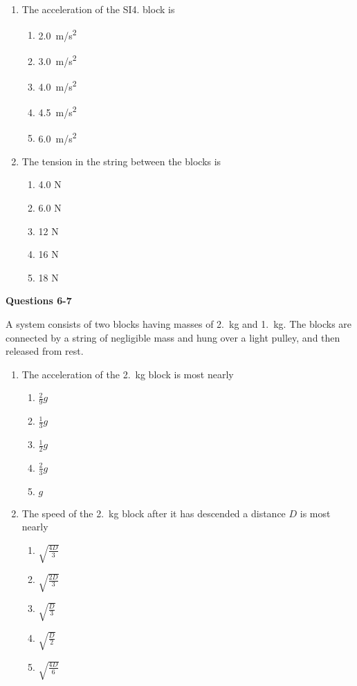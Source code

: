 \documentclass{../../oss-apphys}
\begin{document}
\begin{multicols}{2}
\begin{enumerate}[resume,leftmargin=18pt]
  \item The acceleration of the SI{4.}{\kilo\gram} block is
    \begin{enumerate}[noitemsep,topsep=0pt,leftmargin=18pt,label=(\Alph*)]
    \item\SI{2.0}{m/s^2}
    \item\SI{3.0}{m/s^2}
    \item\SI{4.0}{m/s^2}
    \item\SI{4.5}{m/s^2}
    \item\SI{6.0}{m/s^2}
    \end{enumerate}

  \item The tension in the string between the blocks is
    \begin{enumerate}[noitemsep,topsep=0pt,leftmargin=18pt,label=(\Alph*)]
    \item 4.0 N
    \item 6.0 N
    \item 12 N
    \item 16 N
    \item 18 N
    \end{enumerate}
  \end{enumerate}
  \columnbreak
  
  \textbf{Questions 6-7}

  A system consists of two blocks having masses of \SI{2.}{\kilo\gram} and
  \SI{1.}{\kilo\gram}. The blocks are connected by a string of negligible mass
  and hung over a light pulley, and then released from rest.
  \begin{center}
  \end{center}
  \begin{enumerate}[resume,leftmargin=18pt]
  \item The acceleration of the \SI{2.}{\kilo\gram} block is most nearly
    \begin{enumerate}[noitemsep,topsep=0pt,leftmargin=18pt,label=(\Alph*)]
    \item $\frac{2}{9}g$
    \item $\frac{1}{3}g$
    \item $\frac{1}{2}g$
    \item $\frac{2}{3}g$
    \item $g$
    \end{enumerate}
  \item The speed of the \SI{2.}{\kilo\gram} block after it has descended a
    distance $D$ is most nearly
    \begin{enumerate}[noitemsep,topsep=0pt,leftmargin=18pt,label=(\Alph*)]
    \item $\displaystyle\sqrt{\frac{4D}{3}}$
    \item $\displaystyle\sqrt{\frac{2D}{3}}$
    \item $\displaystyle\sqrt{\frac{D}{3}}$
    \item $\displaystyle\sqrt{\frac{D}{2}}$
    \item $\displaystyle\sqrt{\frac{4D}{6}}$
    \end{enumerate}
  \end{enumerate}
  \columnbreak
  

\end{multicols}
\end{document}
